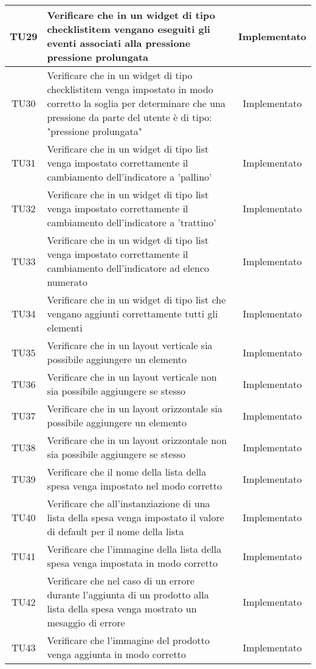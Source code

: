 \begin{center}
\begin{longtable}{|c|>{\centering}m{10cm}|c|}
		TU29 & Verificare che in un widget di tipo checklistitem vengano eseguiti gli eventi associati alla pressione pressione prolungata & Implementato \\ \hline
		TU30 & Verificare che in un widget di tipo checklistitem venga impostato in modo corretto la soglia per determinare che una pressione da parte del utente è di tipo: "pressione prolungata" & Implementato \\ \hline
		TU31 & Verificare che in un widget di tipo list venga impostato correttamente il cambiamento dell'indicatore a 'pallino' & Implementato \\ \hline
		TU32 & Verificare che in un widget di tipo list venga impostato correttamente il cambiamento dell'indicatore a 'trattino' & Implementato \\ \hline
		TU33 & Verificare che in un widget di tipo list venga impostato correttamente il cambiamento dell'indicatore ad elenco numerato & Implementato \\ \hline
		TU34 & Verificare che in un widget di tipo list che vengano aggiunti correttamente tutti gli elementi & Implementato \\ \hline
		TU35 & Verificare che in un layout verticale sia possibile aggiungere un elemento & Implementato \\ \hline
		TU36 & Verificare che in un layout verticale non sia possibile aggiungere se stesso & Implementato \\ \hline
		TU37 & Verificare che in un layout orizzontale sia possibile aggiungere un elemento & Implementato \\ \hline
		TU38 & Verificare che in un layout orizzontale non sia possibile aggiungere se stesso & Implementato \\ \hline
		TU39 & Verificare che il nome della lista della spesa venga impostato nel modo corretto & Implementato \\ \hline
		TU40 & Verificare che all'instanziazione di una lista della spesa venga impostato il valore di default per il nome della lista & Implementato \\ \hline
		TU41 & Verificare che l'immagine della lista della spesa venga impostata in modo corretto & Implementato \\ \hline
		TU42 & Verificare che nel caso di un errore durante l'aggiunta di un prodotto alla lista della spesa venga mostrato un mesaggio di errore & Implementato \\ \hline
		TU43 & Verificare che l'immagine del prodotto venga aggiunta in modo corretto & Implementato \\ \hline

\end{longtable}
\end{center}
